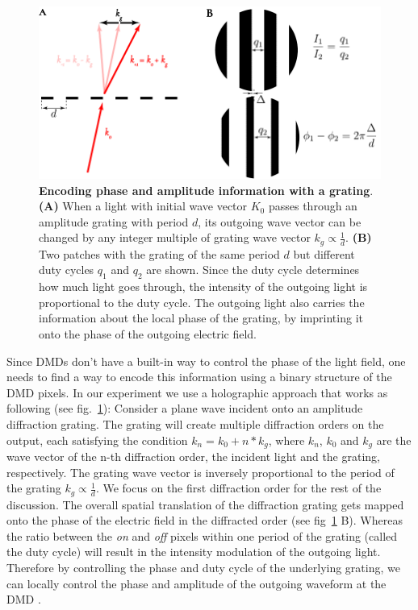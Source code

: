 \begin{figure}[t]
	\centering
	\includegraphics[scale=1]{figures/DMD_grating.pdf}
	\caption{{\bf Encoding phase and amplitude information with a grating}. {\bf (A)} When a light with initial wave vector $K_0$ passes through an amplitude grating with period $d$, its outgoing wave vector can be changed by any integer multiple of grating wave vector $k_g\propto \frac{1}{d}$. {\bf (B)} Two patches with the grating of the same period $d$ but different duty cycles $q_1$ and $q_2$ are shown. Since the duty cycle determines how much light goes through, the intensity of the outgoing light is proportional to the duty cycle. The outgoing light also carries the information about the local phase of the grating, by imprinting it onto the phase of the outgoing electric field.}
	\label{fig:DMD_grating}
\end{figure}



Since DMDs don't have a built-in way to control the phase of the light field, one needs to find a way to encode this information using a binary structure of the DMD pixels. In our experiment we use a holographic approach that works as following (see fig.~\ref{fig:DMD_grating}): Consider a plane wave incident onto an amplitude diffraction grating. The grating will create multiple diffraction orders on the output, each satisfying the condition $k_n = k_0 + n*k_g$, where $k_n$, $k_0$ and $k_g$ are the wave vector of the n-th diffraction order, the incident light and the grating, respectively. The grating wave vector is inversely proportional to the period of the grating $k_g \propto \frac{1}{d}$. We focus on the first diffraction order for the rest of the discussion. The overall spatial translation of the diffraction grating gets mapped onto the phase of the electric field in the diffracted order (see fig~\ref{fig:DMD_grating} B). Whereas the ratio between the \textit{on} and \textit{off} pixels within one period of the grating (called the duty cycle) will result in the intensity modulation of the outgoing light. Therefore by controlling the phase and duty cycle of the underlying grating, we can locally control the phase and amplitude of the outgoing waveform at the DMD \cite{Zupanchich thesis}.

